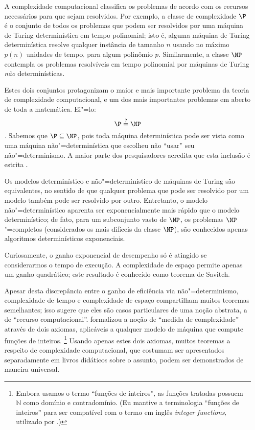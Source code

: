 A complexidade computacional classifica os problemas
de acordo com os recursos necessários para que sejam resolvidos.
Por exemplo,
a classe de complexidade $\P$
é o conjunto de todos os problemas que podem ser resolvidos
por uma máquina de Turing determinística
em tempo polinomial;
isto é,
alguma máquina de Turing determinística
resolve qualquer instância de tamanho $n$
usando no máximo $p(n)$ unidades de tempo,
para algum polinômio $p$.
Similarmente,
a classe $\NP$
contempla os problemas resolvíveis em tempo polinomial
por máquinas de Turing \emph{não} determinísticas.

Estes dois conjuntos protagonizam
o maior e mais importante problema da teoria de complexidade computacional,
e um dos mais importantes problemas em aberto de toda a matemática.
Ei"=lo:
\begin{equation*}
    \P \stackrel?= \NP
\end{equation*}
\cite[p.~270]{Sipser2006}.
Sabemos que $\P \subseteq \NP$,
pois toda máquina determinística pode ser vista como
uma máquina não"=determinística que escolheu não ``usar''
seu não"=determinismo.
A maior parte dos pesquisadores acredita que
esta inclusão é estrita \cite[p.~54]{Gasarch2012}.

Os modelos determinístico e não"=determinístico de máquinas de Turing são equivalentes,
no sentido de que qualquer problema que pode ser resolvido por um modelo
também pode ser resolvido por outro.
Entretanto, o modelo não"=determinístico
aparenta ser exponencialmente mais rápido que
o modelo determinístico;
de fato, para um subconjunto vasto de $\NP$,
os problemas $\NP$"=completos
(considerados os mais difíceis da classe $\NP$),
são conhecidos apenas algoritmos determinísticos exponenciais.

Curiosamente,
o ganho exponencial de desempenho
só é atingido se considerarmos o tempo de execução.
A complexidade de espaço permite apenas um ganho quadrático;
este resultado é conhecido como teorema de Savitch.

Apesar desta discrepância entre o ganho de eficiência via não"=determinismo,
complexidade de tempo e complexidade de espaço
compartilham muitos teoremas semelhantes;
isso sugere que eles são casos particulares de uma noção abstrata,
a de ``recurso computacional''.
 formalizou a noção de ``medida de complexidade''
através de dois axiomas,
aplicáveis a qualquer modelo de máquina que compute funções de inteiros.%
\footnote{
    Embora usamos o termo ``funções de inteiros'',
    as funções tratadas possuem~$\mathbb N$ como domínio e contradomínio.
    (Eu mantive a terminologia ``funções de inteiros''
    para ser compatível com o termo em inglês \emph{integer functions},
    utilizado por .)
}
Usando apenas estes dois axiomas,
muitos teoremas a respeito de complexidade computacional,
que costumam ser apresentados separadamente em livros didáticos sobre o assunto,
podem ser demonstrados de maneira universal.

